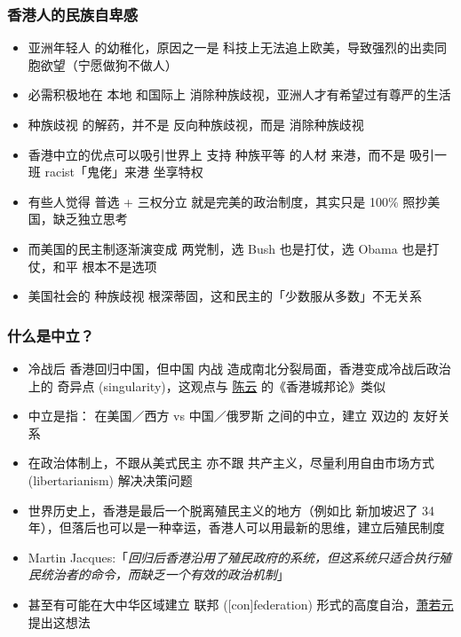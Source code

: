 \documentclass[10pt]{beamer}
\newcommand{\emp}[1]{{\color{blue}#1}}
\begin{document}
\begin{frame}
\frametitle{香港人的民族自卑感}
\begin{itemize}
	\item 亚洲年轻人 的幼稚化，原因之一是 科技上无法追上欧美，导致强烈的出卖同胞欲望（宁愿做狗不做人）
	

	\item 必需积极地在 本地 和国际上 消除种族歧视，亚洲人才有希望过有尊严的生活

	\item 种族歧视 的解药，并不是 反向种族歧视，而是 \emp{消除}种族歧视
	
	\item 香港中立的优点可以吸引世界上 支持 种族平等 的人材 来港，而不是 吸引一班 racist「鬼佬」来港 坐享特权

	\item 有些人觉得 普选 + 三权分立 就是完美的政治制度，其实只是 100\% 照抄美国，缺乏独立思考
	
	\item 而美国的民主制逐渐演变成 两党制，选 Bush 也是打仗，选 Obama 也是打仗，和平 根本不是选项
	
	\item 美国社会的 种族歧视 根深蒂固，这和民主的「少数服从多数」不无关系
\end{itemize}
\end{frame}

\begin{frame}
\frametitle{什么是中立？}
\begin{itemize}
	\item 冷战后 香港回归中国，但中国 内战 造成南北分裂局面，香港变成冷战后政治上的 奇异点 (\emp{singularity})，这观点与 \underline{陈云} 的《香港城邦论》类似

	\item 中立是指： 在美国／西方 vs 中国／俄罗斯 之间的中立，建立 \emp{双边的} 友好关系
	
	\item 在政治体制上，不跟从美式民主 亦不跟 共产主义，尽量利用自由市场方式 (libertarianism) 解决决策问题

	\item 世界历史上，香港是最后一个脱离殖民主义的地方（例如比 新加坡迟了 34 年），但落后也可以是一种幸运，香港人可以用最新的思维，建立后殖民制度

	\item Martin Jacques:「\textit{回归后香港沿用了殖民政府的系统，但这系统只适合执行殖民统治者的命令，而缺乏一个有效的政治机制}」

	\item 甚至有可能在大中华区域建立 \emp{联邦} ([con]federation) 形式的高度自治，\underline{萧若元} 提出这想法
\end{itemize}
\end{frame}
\end{document}
